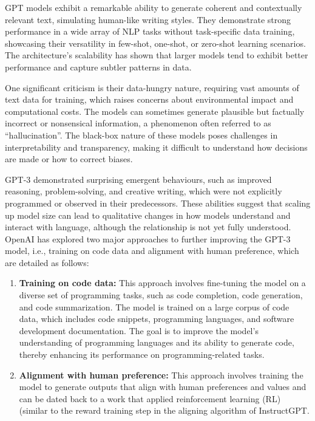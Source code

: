 GPT models exhibit a remarkable ability to generate coherent and contextually relevant text, simulating human-like writing styles.
They demonstrate strong performance in a wide array of NLP tasks without task-specific data training, showcasing their versatility in few-shot, one-shot, or zero-shot learning scenarios.
The architecture's scalability has shown that larger models tend to exhibit better performance and capture subtler patterns in data.

One significant criticism is their data-hungry nature, requiring vast amounts of text data for training, which raises concerns about environmental impact and computational costs.
The models can sometimes generate plausible but factually incorrect or nonsensical information, a phenomenon often referred to as \enquote{hallucination}.
The black-box nature of these models poses challenges in interpretability and transparency, making it difficult to understand how decisions are made or how to correct biases.

GPT-3 demonstrated surprising emergent behaviours, such as improved reasoning, problem-solving, and creative writing, which were not explicitly programmed or observed in their predecessors.
These abilities suggest that scaling up model size can lead to qualitative changes in how models understand and interact with language, although the relationship is not yet fully understood.
OpenAI has explored two major approaches to further improving the GPT-3 model, i.e., training on code data and alignment with human preference, which are detailed as follows:
\begin{enumerate}
	\item \textbf{Training on code data:} {
		      This approach involves fine-tuning the model on a diverse set of programming tasks, such as code completion, code generation, and code summarization.
		      The model is trained on a large corpus of code data, which includes code snippets, programming languages, and software development documentation.
		      The goal is to improve the model's understanding of programming languages and its ability to generate code, thereby enhancing its performance on programming-related tasks.
	      }
	\item \textbf{Alignment with human preference:} {
	      This approach involves training the model to generate outputs that align with human preferences and values and can be dated back to a work that applied reinforcement learning (RL) \textcite{christiano2017deep} (similar to the reward training step in the aligning algorithm of InstructGPT.
	      }
\end{enumerate}

